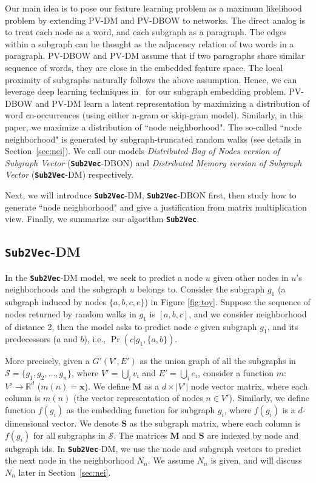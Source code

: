 \documentclass[sigconf]{acmart}
\newcommand{\alg}{{\bf {\tt Sub2Vec}}\xspace}
\newcommand{\s}{\mathcal{S}}
\newcommand{\N}{\mathbf{M}}
\newcommand{\Sv}{\mathbf{S}}
\begin{document}
Our main idea is to pose our feature learning problem as a maximum likelihood problem by extending PV-DM and PV-DBOW  to  networks.  The direct analog is to treat each node as a word, and each subgraph as a paragraph. The edges within a subgraph can be thought as the adjacency relation of two words in a paragraph.  
PV-DBOW and PV-DM assume  that if two paragraphs share similar sequence of words, they are close in the embedded feature space. The local proximity of subgraphs naturally follows the above assumption. 
Hence, we can leverage deep learning techniques in~\cite{le2014distributed} for our subgraph embedding problem. PV-DBOW and PV-DM learn a latent representation by maximizing a distribution of word co-occurrences (using either n-gram or skip-gram model). Similarly, in this paper, we maximize a distribution of ``node neighborhood". The so-called  ``node neighborhood" is generated by subgraph-truncated random walks (see details in Section~\ref{sec:nei}). We call our models  \emph{Distributed Bag of Nodes version of Subgraph Vector }(\alg-DBON) and \emph{Distributed Memory version of Subgraph Vector} (\alg-DM) respectively. 

Next, we will introduce \alg-DM, \alg-DBON first, then study how to generate ``node neighborhood" and give a justification from matrix multiplication view. Finally, we summarize our algorithm \alg.

\subsection{\alg-DM}
\label{sub:svdm}

In the \alg-DM model, we seek to predict a node $u$ given other nodes in $u$'s neighborhoods and the subgraph $u$ belongs to.  Consider the subgraph $g_1$ (a subgraph induced by nodes $\{a, b, c, e\}$)  in Figure \ref{fig:toy}. Suppose the sequence of nodes returned by random walks in $g_1$ is $[ a, b, c]$, and we consider neighborhood of distance 2, then the model asks to predict node $c$ given subgraph $g_1$, and its predecessors ($a$ and $b$), i.e., $\Pr(c | g_1, \{a, b\})$.
 
 More precisely, given a $G'(V', E')$ as the union graph of all the subgraphs in $\s = \{g_1, g_2, \dots , g_n\}$, where $V'=\bigcup_i {v_i}$ and $E'=\bigcup_i {e_i}$, consider a function $m$: $V'\rightarrow \mathbb{R}^d$ ($m(n) = \mathbf{x} $). 
 We define $\N$ as a $d\times |V'|$ node vector matrix, where each column is $m(n)$ (the vector representation of nodes $n \in V'$). 
  Similarly, we define function $f(g_i)$ as the embedding function for subgraph $g_i$, where $f(g_i)$ is a $d$-dimensional vector. We denote $\Sv$ as the  subgraph matrix, where each column is $f(g_i)$ for all subgraphs in $\s$.
  The matrices $\N$ and $\Sv$ are indexed by node and subgraph ids. In \alg-DM, we use the node and subgraph vectors to predict the next node in the neighborhood $N_n$. We assume $N_n$ is given, and will discuss  $N_n$ later in Section~\ref{sec:nei}.  
\end{document}
